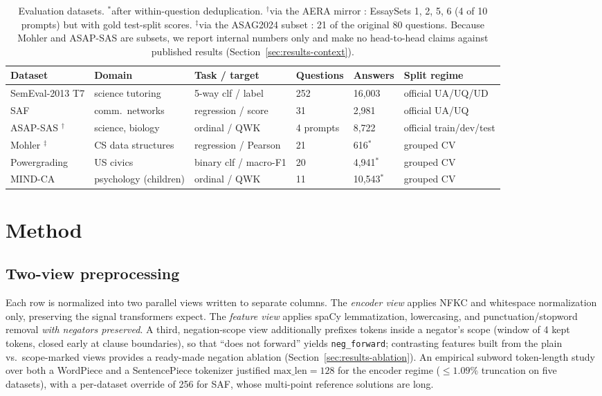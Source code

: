 \documentclass[11pt]{article}
\begin{document}
\begin{table}[t]
\centering\small
\begin{tabular}{llllll}
\toprule
Dataset & Domain & Task / target & Questions & Answers & Split regime \\
\midrule
SemEval-2013 T7 \cite{dzikovska2013semeval} & science tutoring & 5-way clf / label & 252 & 16{,}003 & official UA/UQ/UD \\
SAF \cite{filighera2022your} & comm.\ networks & regression / score & 31 & 2{,}981 & official UA/UQ \\
ASAP-SAS \cite{hewlett2012asapsas}$^{\dagger}$ & science, biology & ordinal / QWK & 4 prompts & 8{,}722 & official train/dev/test \\
Mohler \cite{mohler2011learning}$^{\ddagger}$ & CS data structures & regression / Pearson & 21 & 616$^{*}$ & grouped CV \\
Powergrading \cite{basu2013powergrading} & US civics & binary clf / macro-F1 & 20 & 4{,}941$^{*}$ & grouped CV \\
MIND-CA \cite{kovatchev2020mind} & psychology (children) & ordinal / QWK & 11 & 10{,}543$^{*}$ & grouped CV \\
\bottomrule
\end{tabular}
\caption{Evaluation datasets. $^{*}$after within-question deduplication.
$^{\dagger}$via the AERA mirror \cite{li2023distilling}: EssaySets 1, 2, 5, 6
(4 of 10 prompts) but with gold test-split scores. $^{\ddagger}$via the
ASAG2024 subset \cite{meyer2024asag2024}: 21 of the original 80 questions.
Because Mohler and ASAP-SAS are subsets, we report internal numbers only and
make no head-to-head claims against published results
(Section~\ref{sec:results-context}).}
\label{tab:data}
\end{table}

\section{Method}
\label{sec:method}

\subsection{Two-view preprocessing}
Each row is normalized into two parallel views written to separate columns.
The \emph{encoder view} applies NFKC and whitespace normalization only,
preserving the signal transformers expect. The \emph{feature view} applies
spaCy \cite{honnibal2020spacy} lemmatization, lowercasing, and
punctuation/stopword removal \emph{with negators preserved}. A third,
negation-scope view additionally prefixes tokens inside a negator's scope
(window of 4 kept tokens, closed early at clause boundaries), so that
``does not forward'' yields \texttt{neg\_forward}; contrasting features built
from the plain vs.\ scope-marked views provides a ready-made negation ablation
(Section~\ref{sec:results-ablation}). An empirical subword token-length study
over both a WordPiece and a SentencePiece tokenizer justified
$\text{max\_len}=128$ for the encoder regime ($\le 1.09\%$ truncation on five
datasets), with a per-dataset override of 256 for SAF, whose multi-point
reference solutions are long.
\end{document}
